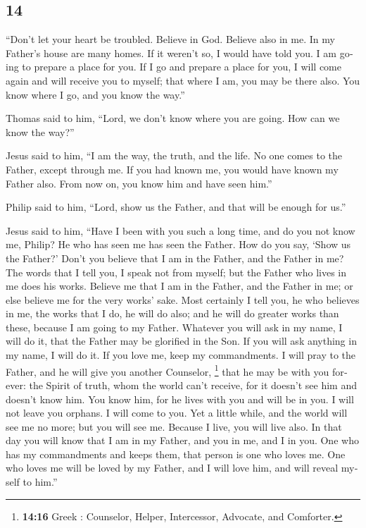 \begin{paracol}{2}
\switchcolumn
\begin{otherlanguage}{english}

\hypertarget{section-27}{%
\section{14}\label{section-27}}

 ``Don't let your heart be troubled. Believe in God.
Believe also in me.  In my Father's house are many homes.
If it weren't so, I would have told you. I am going to prepare a place
for you.  If I go and prepare a place for you, I will come
again and will receive you to myself; that where I am, you may be there
also.  You know where I go, and you know the way.''

 Thomas said to him, ``Lord, we don't know where you are
going. How can we know the way?''

 Jesus said to him, ``I am the way, the truth, and the
life. No one comes to the Father, except through me.  If
you had known me, you would have known my Father also. From now on, you
know him and have seen him.''

 Philip said to him, ``Lord, show us the Father, and that
will be enough for us.''

 Jesus said to him, ``Have I been with you such a long
time, and do you not know me, Philip? He who has seen me has seen the
Father. How do you say, `Show us the Father?'  Don't you
believe that I am in the Father, and the Father in me? The words that I
tell you, I speak not from myself; but the Father who lives in me does
his works.  Believe me that I am in the Father, and the
Father in me; or else believe me for the very works' sake.
 Most certainly I tell you, he who believes in me, the
works that I do, he will do also; and he will do greater works than
these, because I am going to my Father.  Whatever you
will ask in my name, I will do it, that the Father may be glorified in
the Son.  If you will ask anything in my name, I will do
it.  If you love me, keep my commandments.
 I will pray to the Father, and he will give you another
Counselor, \footnote{\textbf{14:16} Greek : Counselor,
  Helper, Intercessor, Advocate, and Comforter.} that he may be with you
forever:  the Spirit of truth, whom the world can't
receive, for it doesn't see him and doesn't know him. You know him, for
he lives with you and will be in you.  I will not leave
you orphans. I will come to you.  Yet a little while, and
the world will see me no more; but you will see me. Because I live, you
will live also.  In that day you will know that I am in
my Father, and you in me, and I in you.  One who has my
commandments and keeps them, that person is one who loves me. One who
loves me will be loved by my Father, and I will love him, and will
reveal myself to him.''


\end{otherlanguage}
\end{paracol}

